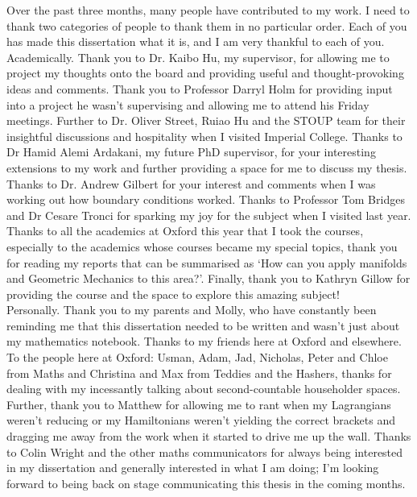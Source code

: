 
Over the past three months, many people have contributed to my work. I need to thank two categories of people to thank them in no particular order. Each of you has made this dissertation what it is, and I am very thankful to each of you. \\

\noindent
Academically. Thank you to Dr. Kaibo Hu, my supervisor, for allowing me to project my thoughts onto the board and providing useful and thought-provoking ideas and comments. Thank you to Professor Darryl Holm for providing input into a project he wasn't supervising and allowing me to attend his Friday meetings. Further to Dr. Oliver Street, Ruiao Hu and the STOUP team for their insightful discussions and hospitality when I visited Imperial College. Thanks to Dr Hamid Alemi Ardakani, my future PhD supervisor, for your interesting extensions to my work and further providing a space for me to discuss my thesis. Thanks to Dr. Andrew Gilbert for your interest and comments when I was working out how boundary conditions worked. Thanks to Professor Tom Bridges and Dr Cesare Tronci for sparking my joy for the subject when I visited last year. Thanks to all the academics at Oxford this year that I took the courses, especially to the academics whose courses became my special topics, thank you for reading my reports that can be summarised as `How can you apply manifolds and Geometric Mechanics to this area?'. Finally, thank you to Kathryn Gillow for providing the course and the space to explore this amazing subject!\\

\noindent
Personally. Thank you to my parents and Molly, who have constantly been reminding me that this dissertation needed to be written and wasn't just about my mathematics notebook. Thanks to my friends here at Oxford and elsewhere. To the people here at Oxford: Usman, Adam, Jad, Nicholas, Peter and Chloe from Maths and Christina and Max from Teddies and the Hashers, thanks for dealing with my incessantly talking about second-countable householder spaces. Further, thank you to Matthew for allowing me to rant when my Lagrangians weren't reducing or my Hamiltonians weren't yielding the correct brackets and dragging me away from the work when it started to drive me up the wall. Thanks to Colin Wright and the other maths communicators for always being interested in my dissertation and generally interested in what I am doing; I'm looking forward to being back on stage communicating this thesis in the coming months.